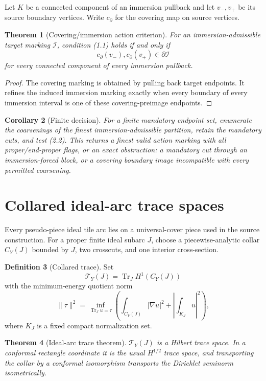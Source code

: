 \documentclass[11pt]{article}
\newtheorem{theorem}{Theorem}[section]
\newtheorem{corollary}[theorem]{Corollary}
\theoremstyle{definition}
\newtheorem{definition}[theorem]{Definition}
\theoremstyle{remark}
\newcommand{\Tr}{\operatorname{Tr}}
\begin{document}
Let $K$ be a connected component of an immersion pullback and let
$v_-,v_+$ be its source boundary vertices.  Write $c_\partial$ for the covering
map on source vertices.

\begin{theorem}[Covering/immersion action criterion]
For an immersion-admissible target marking $\mathcal I$, condition (1.1) holds
if and only if
\[
 \boxed{c_\partial(v_-),c_\partial(v_+)\in\partial\mathcal I}
 \tag{2.2}
\]
for every connected component of every immersion pullback.
\end{theorem}

\begin{proof}
The covering marking is obtained by pulling back target endpoints.  It refines
the induced immersion marking exactly when every boundary of every immersion
interval is one of these covering-preimage endpoints.
\end{proof}

\begin{corollary}[Finite decision]
For a finite mandatory endpoint set, enumerate the coarsenings of the finest
immersion-admissible partition, retain the mandatory cuts, and test (2.2).
This returns a finest valid action marking with all proper/end-proper flags, or
an exact obstruction: a mandatory cut through an immersion-forced block, or a
covering boundary image incompatible with every permitted coarsening.
\end{corollary}

\section{Collared ideal-arc trace spaces}
Every pseudo-piece ideal tile arc lies on a universal-cover piece used in the
source construction.  For a proper finite ideal subarc $J$, choose a
piecewise-analytic collar $C_Y(J)$ bounded by $J$, two crosscuts, and one
interior cross-section.

\begin{definition}[Collared trace]
Set
\[
 \mathcal T_Y(J)=\Tr_J H^1(C_Y(J))
\]
with the minimum-energy quotient norm
\[
 \|\tau\|^2=\inf_{\Tr_Ju=\tau}
 \left(\int_{C_Y(J)}|\nabla u|^2+
 \left|\int_{K_J}u\right|^2\right),
 \tag{3.1}
\]
where $K_J$ is a fixed compact normalization set.
\end{definition}

\begin{theorem}[Ideal-arc trace theorem]
$\mathcal T_Y(J)$ is a Hilbert trace space.  In a conformal rectangle
coordinate it is the usual $H^{1/2}$ trace space, and transporting the collar
by a conformal isomorphism transports the Dirichlet seminorm isometrically.
\end{theorem}
\end{document}
